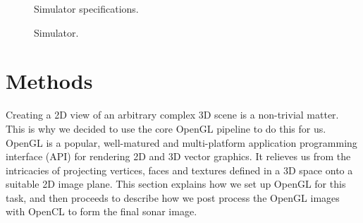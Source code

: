 \documentclass[
   UAM                                          %
 , 12pt                                         %
 , bibtex                                       %
 , layout
]{common/mytemplate}
\begin{document}

% 


\begin{figure}[t]\centering%
%
\caption{Simulator specifications.}\label{specs}%
\end{figure}

\begin{figure}[t]\centering%
%
\caption{Simulator.}\label{buildup}%
\end{figure}

\section{Methods}

Creating a 2D view of an arbitrary complex 3D scene is a non-trivial matter. This is why we decided to use the core OpenGL pipeline to do this for us. OpenGL is a popular, well-matured and multi-platform application programming interface (API) for rendering 2D and 3D vector graphics. It relieves us from the intricacies of projecting vertices, faces and textures defined in a 3D space onto a suitable 2D image plane. This section explains how we set up OpenGL for this task, and then proceeds to describe how we post process the OpenGL images with OpenCL to form the final sonar image.
\end{document}
